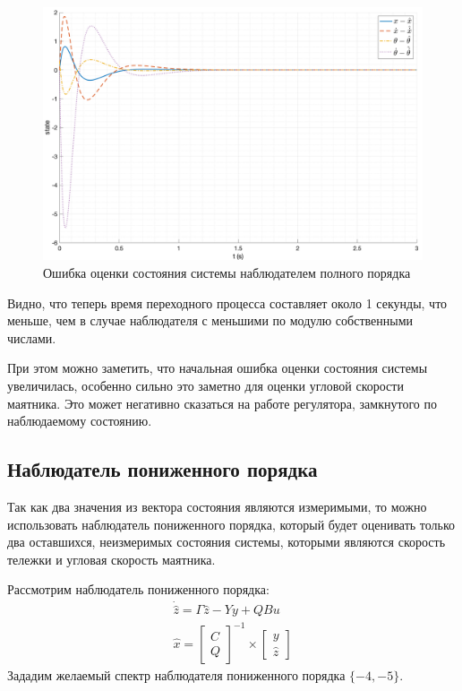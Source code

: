 \begin{figure}[ht!]
    \centering
    \includegraphics[width=\textwidth]{media/plots/modal_observer/observer_err_2.png}
    \caption{Ошибка оценки состояния системы наблюдателем полного порядка}
    \label{fig:observer_err_2}
\end{figure}
\FloatBarrier
Видно, что теперь время переходного процесса составляет около 1 секунды, что меньше, чем в случае 
наблюдателя с меньшими по модулю собственными числами. 

При этом можно заметить, что начальная ошибка оценки состояния системы увеличилась, особенно сильно это заметно
для оценки угловой скорости маятника. Это может негативно сказаться на работе регулятора, замкнутого по наблюдаемому состоянию.

\subsection{Наблюдатель пониженного порядка}
Так как два значения из вектора состояния являются измеримыми, то можно использовать наблюдатель пониженного порядка, 
который будет оценивать только два оставшихся, неизмеримых состояния системы, которыми являются скорость тележки и угловая скорость маятника.

Рассмотрим наблюдатель пониженного порядка:
\begin{equation}
    \begin{array}{ll}
        \dot{\hat{z}} = \Gamma\hat{z} - Yy + QBu\\
        \hat{x} = \begin{bmatrix}
            C \\ Q
        \end{bmatrix}^{-1} \times \begin{bmatrix}
            y \\ 
            \hat{z}
        \end{bmatrix}
    \end{array}
\end{equation}
Зададим желаемый спектр наблюдателя пониженного порядка $\{-4, -5\}$.


